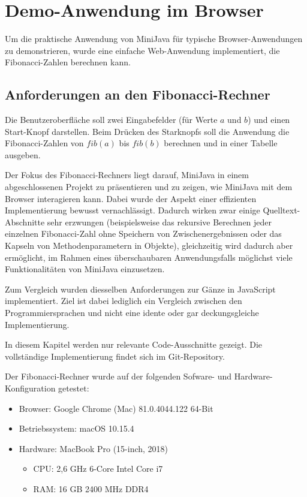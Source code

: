 \chapter{Demo-Anwendung im Browser}

Um die praktische Anwendung von MiniJava für typische Browser-Anwendungen zu demonstrieren, wurde eine einfache Web-Anwendung implementiert, die Fibonacci-Zahlen berechnen kann.

\section{Anforderungen an den Fibonacci-Rechner}
Die Benutzeroberfläche soll zwei Eingabefelder (für Werte $a$ und $b$) und einen Start-Knopf darstellen. Beim Drücken des Starknopfs soll die Anwendung die Fibonacci-Zahlen von $fib(a)$ bis $fib(b)$ berechnen und in einer Tabelle ausgeben.

Der Fokus des Fibonacci-Rechners liegt darauf, MiniJava in einem abgeschlossenen Projekt zu präsentieren und zu zeigen, wie MiniJava mit dem Browser interagieren kann. Dabei wurde der Aspekt einer effizienten Implementierung bewusst vernachlässigt. Dadurch wirken zwar einige Quelltext-Abschnitte sehr erzwungen (beispielsweise das rekursive Berechnen jeder einzelnen Fibonacci-Zahl ohne Speichern von Zwischenergebnissen oder das Kapseln von Methodenparametern in Objekte), gleichzeitig wird dadurch aber ermöglicht, im Rahmen eines überschaubaren Anwendungsfalls möglichst viele Funktionalitäten von MiniJava einzusetzen.

Zum Vergleich wurden diesselben Anforderungen zur Gänze in JavaScript implementiert. Ziel ist dabei lediglich ein Vergleich zwischen den Programmiersprachen und nicht eine idente oder gar deckungsgleiche Implementierung.

In diesem Kapitel werden nur relevante Code-Ausschnitte gezeigt. Die vollständige Implementierung findet sich im Git-Repository.

Der Fibonacci-Rechner wurde auf der folgenden Sofware- und Hardware-Konfiguration getestet:
\begin{itemize}
    \item Browser: Google Chrome (Mac) 81.0.4044.122 64-Bit
    \item Betriebssystem: macOS 10.15.4
    \item Hardware: MacBook Pro (15-inch, 2018)
    \begin{itemize}
        \item CPU: 2,6 GHz 6-Core Intel Core i7
        \item RAM: 16 GB 2400 MHz DDR4
    \end{itemize}
\end{itemize}

